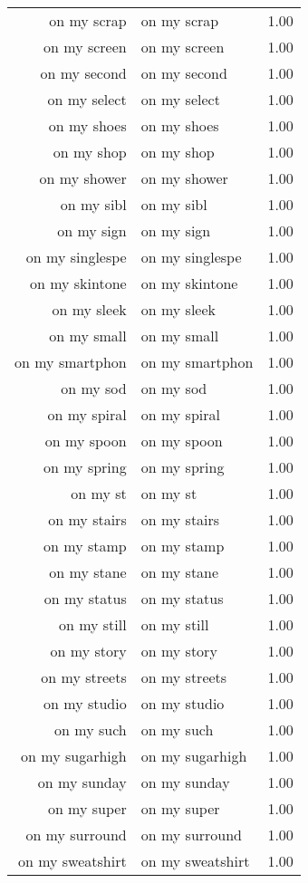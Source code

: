 \begin{table}[ht]
\begin{tabular}{rlr}
  on my scrap & on my scrap & 1.00 \\ 
  on my screen & on my screen & 1.00 \\ 
  on my second & on my second & 1.00 \\ 
  on my select & on my select & 1.00 \\ 
  on my shoes & on my shoes & 1.00 \\ 
  on my shop & on my shop & 1.00 \\ 
  on my shower & on my shower & 1.00 \\ 
  on my sibl & on my sibl & 1.00 \\ 
  on my sign & on my sign & 1.00 \\ 
  on my singlespe & on my singlespe & 1.00 \\ 
  on my skintone & on my skintone & 1.00 \\ 
  on my sleek & on my sleek & 1.00 \\ 
  on my small & on my small & 1.00 \\ 
  on my smartphon & on my smartphon & 1.00 \\ 
  on my sod & on my sod & 1.00 \\ 
  on my spiral & on my spiral & 1.00 \\ 
  on my spoon & on my spoon & 1.00 \\ 
  on my spring & on my spring & 1.00 \\ 
  on my st & on my st & 1.00 \\ 
  on my stairs & on my stairs & 1.00 \\ 
  on my stamp & on my stamp & 1.00 \\ 
  on my stane & on my stane & 1.00 \\ 
  on my status & on my status & 1.00 \\ 
  on my still & on my still & 1.00 \\ 
  on my story & on my story & 1.00 \\ 
  on my streets & on my streets & 1.00 \\ 
  on my studio & on my studio & 1.00 \\ 
  on my such & on my such & 1.00 \\ 
  on my sugarhigh & on my sugarhigh & 1.00 \\ 
  on my sunday & on my sunday & 1.00 \\ 
  on my super & on my super & 1.00 \\ 
  on my surround & on my surround & 1.00 \\ 
  on my sweatshirt & on my sweatshirt & 1.00 \\ 

\end{tabular}
\end{table}
